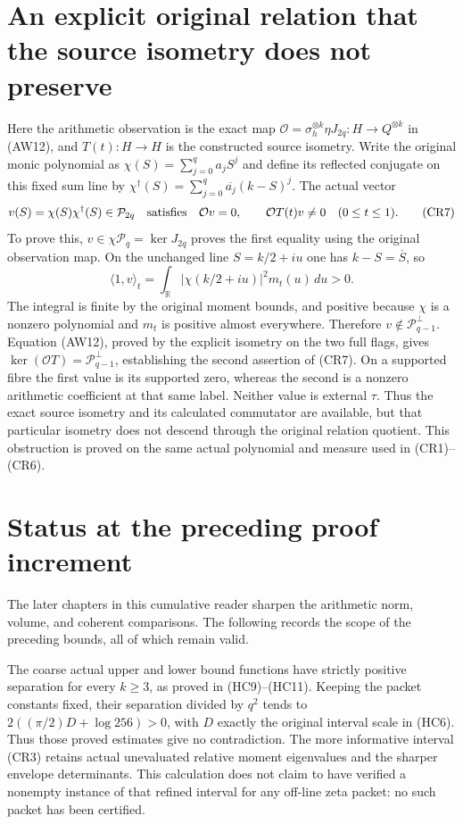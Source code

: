 \section{An explicit original relation that the source isometry does not preserve}

Here the arithmetic observation is the exact map
$\mathcal O=\sigma_h^{\otimes k}\eta J_{2q}:H\to Q^{\otimes k}$
in (AW12), and $T(t):H\to H$ is the constructed source isometry.
Write the original monic polynomial as $\chi(S)=\sum_{j=0}^q a_jS^j$
and define its reflected conjugate on this fixed sum line by
$\chi^\dagger(S)=\sum_{j=0}^q\overline{a_j}(k-S)^j$.
The actual vector
\[
 v(S)=\chi(S)\chi^\dagger(S)\in\mathcal P_{2q}
 \quad\hbox{satisfies}\quad
 \mathcal O v=0,\qquad \mathcal O T(t)v\ne0
 \quad(0\le t\le1).                                    \tag{CR7}
\]
To prove this, $v\in\chi\mathcal P_q=\ker J_{2q}$ proves
the first equality using the original observation map. On the unchanged
line $S=k/2+iu$ one has $k-S=\overline S$, so
\[
 \langle1,v\rangle_t=\int_{\mathbb R}
 |\chi(k/2+iu)|^2m_t(u)\,du>0.
\]
The integral is finite by the original moment bounds, and positive
because $\chi$ is a nonzero polynomial and $m_t$ is positive almost
everywhere. Therefore $v\notin\mathcal P_{q-1}^\perp$.
Equation (AW12), proved by the explicit isometry on the two full flags,
gives $\ker(\mathcal O T)=\mathcal P_{q-1}^\perp$, establishing
the second assertion of (CR7). On a supported fibre the first value
is its supported zero, whereas the second is a nonzero arithmetic
coefficient at that same label. Neither value is external $\tau$.
Thus the exact source isometry and its calculated commutator are
available, but that particular isometry does not descend through the
original relation quotient. This obstruction is proved on the same
actual polynomial and measure used in (CR1)--(CR6).

\section{Status at the preceding proof increment}
The later chapters in this cumulative reader sharpen the arithmetic norm, volume, and coherent comparisons. The following records the scope of the preceding bounds, all of which remain valid.


The coarse actual upper and lower bound functions have strictly positive
separation for every $k\ge3$, as proved in (HC9)--(HC11). Keeping the
packet constants fixed, their separation divided by $q^2$ tends to
$2((\pi/2)D+\log256)>0$, with $D$ exactly the original interval scale
in (HC6). Thus those proved estimates give no contradiction. The more
informative interval (CR3) retains actual unevaluated relative moment
eigenvalues and the sharper envelope determinants. This calculation
does not claim to have verified a nonempty instance of that refined
interval for any off-line zeta packet: no such packet has been certified.


